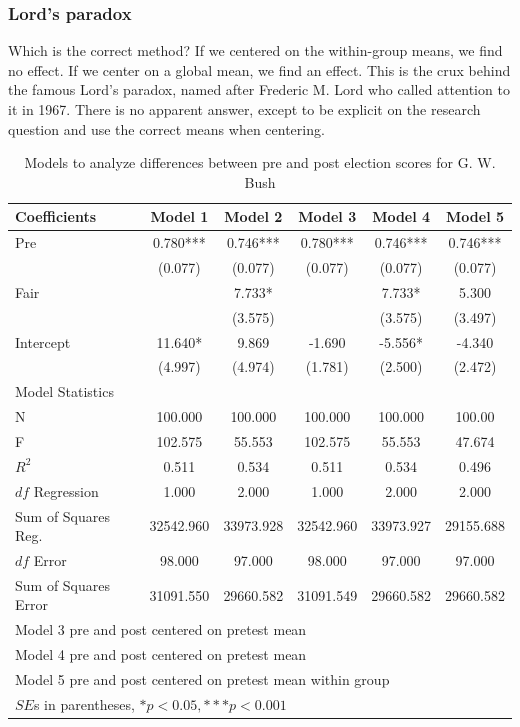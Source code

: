 \subsubsection{Lord's paradox}

Which is the correct method? If we centered on the within-group means, we find no effect. If we center on a global mean, we find an effect. This is the crux behind the famous Lord's paradox, named after Frederic M. Lord who called attention to it in 1967. There is no apparent answer, except to be explicit on the research question and use the correct means when centering.

\begin{table}[htbp]\centering
 \caption{Models to analyze differences between pre and post election scores for G. W. Bush
\label{tab:bushreg}}
\begin{tabular}{lccccc}
\hline
Coefficients & Model 1 & Model 2 & Model 3 & Model 4 & Model 5 \\
\hline
Pre  &    0.780***&    0.746***&    0.780***&    0.746*** & 0.746*** \\
      &   (0.077)  &   (0.077)  &   (0.077)  &   (0.077) & (0.077) \\
Fair    &        &    7.733* &        &    7.733* & 5.300 \\
      &        &   (3.575)  &        &   (3.575) & (3.497)  \\
Intercept    &   11.640* &    9.869  &   -1.690  &   -5.556* & -4.340 \\
      &   (4.997)  &   (4.974)  &   (1.781)  &   (2.500) & (2.472) \\
\hline
\multicolumn{6}{l}{Model Statistics} \\
\hline
N      &   100.000  &   100.000  &   100.000  &   100.000 & 100.00 \\
F      &   102.575  &   55.553  &   102.575  &   55.553 & 47.674  \\
$R^2$     &    0.511  &    0.534  &    0.511  &    0.534 & 0.496 \\
$df$ Regression    &    1.000  &    2.000  &    1.000  &    2.000 & 2.000 \\
Sum of Squares Reg.    &  32542.960  &  33973.928  &  32542.960  &  33973.927 & 29155.688  \\
$df$ Error    &   98.000  &   97.000  &   98.000  &   97.000 & 97.000  \\
Sum of Squares Error     &  31091.550  &  29660.582  &  31091.549  &  29660.582 & 29660.582  \\
\hline
\multicolumn{5}{l}{Model 3 pre and post centered on pretest mean } \\
\multicolumn{5}{l}{Model 4 pre and post centered on pretest mean } \\
\multicolumn{5}{l}{Model 5 pre and post centered on pretest mean within group} \\
\multicolumn{5}{l}{$SE$s in parentheses, $*p<0.05, ***p<0.001$} \\
\hline
\end{tabular}
\end{table}